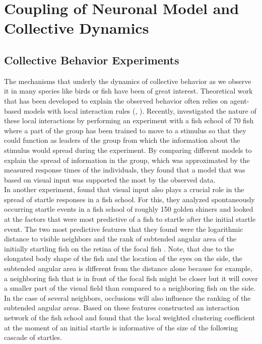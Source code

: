\chapter{Coupling of Neuronal Model and Collective Dynamics}
    \section{Collective Behavior Experiments}
    The mechanisms that underly the dynamics of collective behavior as we observe it in many species like birds or fish have been of great interest.
    Theoretical work that has been developed to explain the observed behavior often relies on agent-based models with local interaction rules (\cite{Couzin2002}, \cite{Vicsek1995}).
    Recently, \cite{Strandburg-Peshkin2013} investigated the nature of these local interactions by performing an experiment with a fish school of 70 fish where a part of the group has been trained to move to a stimulus so that they could function as leaders of the group from which the information about the stimulus would spread during the experiment.
    By comparing different models to explain the spread of information in the group, which was approximated by the measured response times of the individuals, they found that a model that was based on visual input was supported the most by the observed data.\\
    In another experiment, \cite{Rosenthal2015} found that visual input also plays a crucial role in the spread of startle responses in a fish school.
    For this, they analyzed spontaneously occurring startle events in a fish school of roughly 150 golden shiners and looked at the factors that were most predictive of a fish to startle after the initial startle event.
    The two most predictive features that they found were the logarithmic distance to visible neighbors and the rank of subtended angular area of the initially startling fish on the retina of the focal fish \citep{Rosenthal2015}.
    Note, that due to the elongated body shape of the fish and the location of the eyes on the side, the subtended angular area is different from the distance alone because for example, a neighboring fish that is in front of the focal fish might be closer but it will cover a smaller part of the visual field than compared to a neighboring fish on the side.
    In the case of several neighbors, occlusions will also influence the ranking of the subtended angular areas.
    Based on these features \cite{Rosenthal2015} constructed an interaction network of the fish school and found that the local weighted clustering coefficient at the moment of an initial startle is informative of the size of the following cascade of startles.\\
